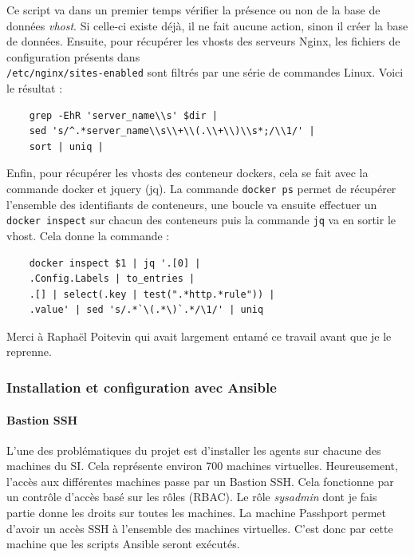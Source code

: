 \documentclass[12pt]{article}
\begin{document}
Ce script va dans un premier temps vérifier la présence ou non de la base de données \textit{vhost}.
Si celle-ci existe déjà, il ne fait aucune action, sinon il créer la base de données.
Ensuite, pour récupérer les vhosts des serveurs Nginx, les fichiers de configuration présents dans \\ \verb|/etc/nginx/sites-enabled| sont filtrés par une série de commandes Linux.
Voici le résultat :
\begin{verbatim}
    grep -EhR 'server_name\\s' $dir | 
    sed 's/^.*server_name\\s\\+\\(.\\+\\)\\s*;/\\1/' |
    sort | uniq |
\end{verbatim}
Enfin, pour récupérer les vhosts des conteneur dockers, cela se fait avec la commande docker et jquery (jq).
La commande \verb|docker ps| permet de récupérer l'ensemble des identifiants de conteneurs, une boucle va ensuite effectuer un \verb|docker inspect| sur chacun des conteneurs puis la commande \verb|jq| va en sortir le vhost.
Cela donne la commande :
\begin{verbatim}
    docker inspect $1 | jq '.[0] |
    .Config.Labels | to_entries |
    .[] | select(.key | test(".*http.*rule")) |
    .value' | sed 's/.*`\(.*\)`.*/\1/' | uniq
\end{verbatim}

Merci à Raphaël Poitevin qui avait largement entamé ce travail avant que je le reprenne.

\subsubsection{Installation et configuration avec Ansible}
\paragraph{Bastion SSH}
L'une des problématiques du projet est d'installer les agents sur chacune des machines du SI. 
Cela représente environ 700 machines virtuelles. 
Heureusement, l'accès aux différentes machines passe par un Bastion SSH. 
Cela fonctionne par un contrôle d'accès basé sur les rôles (RBAC). 
Le rôle \textit{sysadmin} dont je fais partie donne les droits sur toutes les machines. 
La machine Passhport permet d'avoir un accès SSH à l'ensemble des machines virtuelles.
C'est donc par cette machine que les scripts Ansible seront exécutés.
\end{document}
